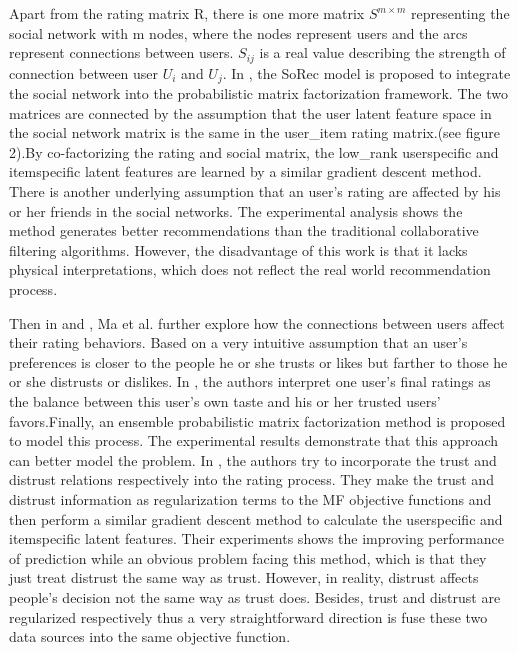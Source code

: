\documentclass[10pt,onecolumn,conference]{IEEEtran}
\begin{document}
Apart from the rating matrix R, there is one more matrix $S^{m \times m}$ representing the social network with m nodes, where the nodes represent users and the arcs represent connections between users. $S_{ij}$ is a real value describing the strength of connection between user $U_i$ and $U_j$. In \cite{ma2008sorec}, the SoRec model is proposed to integrate the social network into the probabilistic matrix factorization framework. The two matrices are connected by the assumption that the user latent feature space in the social network matrix is the same in the user\_item rating matrix.(see figure 2).By co-factorizing the rating and social matrix, the low\_rank user\-specific and item\-specific latent features are learned by a similar gradient descent method. There is another underlying assumption that an user's rating are affected by his or her friends in the social networks. The experimental analysis shows the method generates better recommendations than the traditional collaborative filtering algorithms. However, the disadvantage of this work is that it lacks physical interpretations, which does not reflect the real world recommendation process.

Then in \cite{ma2009llearningEnsembel} and \cite{ma2009learningTrust}, Ma et al. further explore how the connections between users affect their rating behaviors. Based on a very intuitive assumption that an user's preferences is closer to the people he or she trusts or likes but farther to those he or she distrusts or dislikes. In \cite{ma2009llearningEnsembel}, the authors interpret one user's final ratings as the balance between this user's own taste and his or her trusted users' favors.Finally, an ensemble probabilistic matrix factorization method is proposed to model this process. The experimental results demonstrate that this approach can better model the problem. In \cite{ma2009learningTrust}, the authors try to incorporate the trust and distrust relations respectively into the rating process. They make the trust and distrust information as regularization terms to the MF objective functions and then perform a similar gradient descent method to calculate the user\-specific and item\-specific latent features. Their experiments shows the improving performance of prediction while an obvious problem facing this method, which is that they just treat distrust the same way as trust. However, in reality, distrust affects people's decision not the same way as trust does. Besides, trust and distrust are regularized respectively thus a very straightforward direction is fuse these two data sources into the same objective function. 
\end{document}
